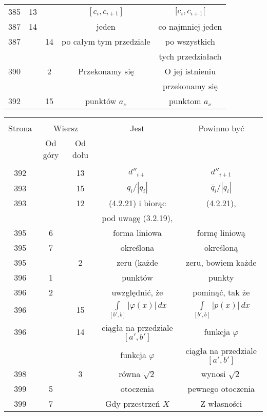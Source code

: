 \documentclass[a4paper,11pt]{article}
\begin{document}
\begin{center}
\begin{tabular}{|c|c|c|c|c|}
    385 & 13 & & $[ c_{ i }, c_{ i + 1} ]$ & $[ c_{ i }, c_{ i + 1} [$ \\
    387 & 14 & & jeden & co najmniej jeden \\
    387 & & 14 & po całym tym przedziale & po wszystkich \\
    & & & & tych przedziałach \\
    390 & &  2 & Przekonamy się & O jej istnieniu \\
    & & & & przekonamy się \\
    392 & & 15 & punktów $a_{ \nu }$ & punktom $a_{ \nu }$ \\
    \hline
  \end{tabular}

  \begin{tabular}{|c|c|c|c|c|}
    \hline
    & \multicolumn{2}{c|}{} & & \\
    Strona & \multicolumn{2}{c|}{Wiersz}& Jest & Powinno być \\ \cline{2-3}
    & Od góry & Od dołu &  &  \\ \hline
    & & & & \\
    392 & & 13 & $d''_{ i + }$ & $d''_{ i + 1 }$ \\
    393 & & 15 & $q_{ i }/| q_{ i } |$ & $\bar{ q }_{ i }/| q_{ i } |$ \\
    393 & & 12 & (4.2.21) i biorąc & (4.2.21), \\
    & & & pod uwagę (3.2.19), & \\
    395 &  6 & & forma liniowa & formę liniową \\
    395 &  7 & & określona & określoną \\
    395 & &  2 & zeru (każde & zeru, bowiem każde \\
    396 &  1 & & punktów & punkty \\
    396 &  2 & & uwzględnić, że & pominąć, tak że \\
    396 & & 15 & $\int\limits_{ [ b', b ] } | \varphi( x ) | \, dx$
           & $\int\limits_{ [ b', b ] } | p( x ) | \, dx$ \\
    396 & & 14 & ciągła na przedziale $[ a', b' ]$ & funkcja $\varphi$ \\
    & & & funkcja $\varphi$ & ciągła na przedziale $[ a', b' ]$ \\
    398 & &  3 & równa $\sqrt{ 2 }$ & wynosi $\sqrt{ 2 }$ \\
    399 &  5 & & otoczenia & pewnego otoczenia \\
    399 &  7 & & Gdy przestrzeń $X$ & Z własności \\

\end{tabular}
\end{center}
\end{document}
